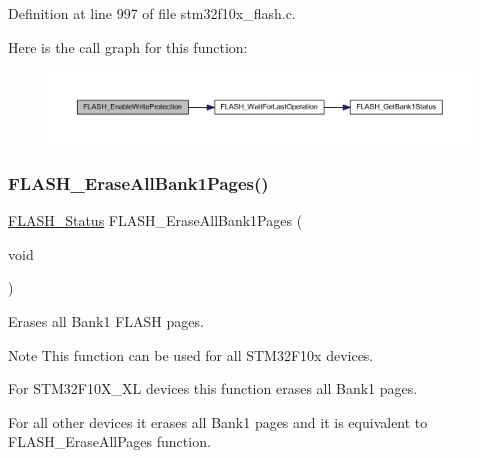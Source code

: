 Definition at line 997 of file stm32f10x\+\_\+flash.\+c.

Here is the call graph for this function\+:
\nopagebreak
\begin{figure}[H]
\begin{center}
\leavevmode
\includegraphics[width=350pt]{group___f_l_a_s_h___private___functions_gabad10c15e2d1ff1cb9e1083d08a9e763_cgraph}
\end{center}
\end{figure}
\mbox{\label{group___f_l_a_s_h___private___functions_ga2036728450ee18e789b25fe3fd9c80ee}} 
\subsubsection{\texorpdfstring{F\+L\+A\+S\+H\+\_\+\+Erase\+All\+Bank1\+Pages()}{FLASH\_EraseAllBank1Pages()}}
{\footnotesize\ttfamily \hyperlink{group___f_l_a_s_h___exported___types_gadc63a6f3404ff1f71229a66915e9cdc0}{F\+L\+A\+S\+H\+\_\+\+Status} F\+L\+A\+S\+H\+\_\+\+Erase\+All\+Bank1\+Pages (\begin{DoxyParamCaption}\item[{void}]{ }\end{DoxyParamCaption})}



Erases all Bank1 F\+L\+A\+SH pages. 

\begin{DoxyNote}{Note}
This function can be used for all S\+T\+M32\+F10x devices.
\begin{DoxyItemize}
\item For S\+T\+M32\+F10\+X\+\_\+\+XL devices this function erases all Bank1 pages.
\item For all other devices it erases all Bank1 pages and it is equivalent to F\+L\+A\+S\+H\+\_\+\+Erase\+All\+Pages function. 
\end{DoxyItemize}
\end{DoxyNote}


